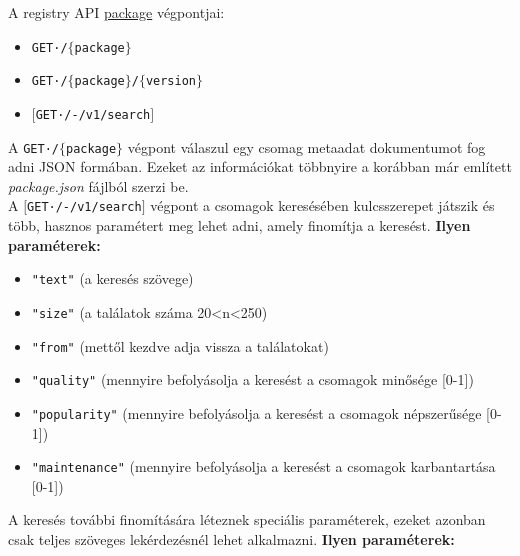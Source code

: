A registry API \underline{package} végpontjai:

\begin{itemize}
	\item \texttt{GET·/$\bigl\{$package$\bigr\}$}
	\item \texttt{GET·/$\bigl\{$package$\bigr\}$/$\bigl\{$version$\bigr\}$}
	\item \texttt{$\big[$GET·/-/v1/search$\big]$}
\end{itemize}

A \texttt{GET·/$\bigl\{$package$\bigr\}$} végpont válaszul egy csomag metaadat dokumentumot fog adni JSON formában. Ezeket az információkat többnyire a korábban már említett \emph{package.json} fájlból szerzi be.\\

A \texttt{$\big[$GET·/-/v1/search$\big]$} végpont a csomagok keresésében kulcsszerepet játszik és több, hasznos paramétert meg lehet adni, amely finomítja a keresést.
\textbf{Ilyen paraméterek:}

\begin{itemize}
	\item \texttt{"text"} (a keresés szövege)
	\item \texttt{"size"} (a találatok száma 20<n<250)
	\item \texttt{"from"} (mettől kezdve adja vissza a találatokat)
	\item \texttt{"quality"} (mennyire befolyásolja a keresést a csomagok minősége [0-1])
	\item \texttt{"popularity"} (mennyire befolyásolja a keresést a csomagok népszerűsége [0-1])
	\item \texttt{"maintenance"} (mennyire befolyásolja a keresést a csomagok karbantartása  [0-1])
\end{itemize}

\pagebreak

A keresés további finomítására léteznek speciális paraméterek, ezeket azonban csak teljes szöveges lekérdezésnél lehet alkalmazni.
\textbf{Ilyen paraméterek:}

